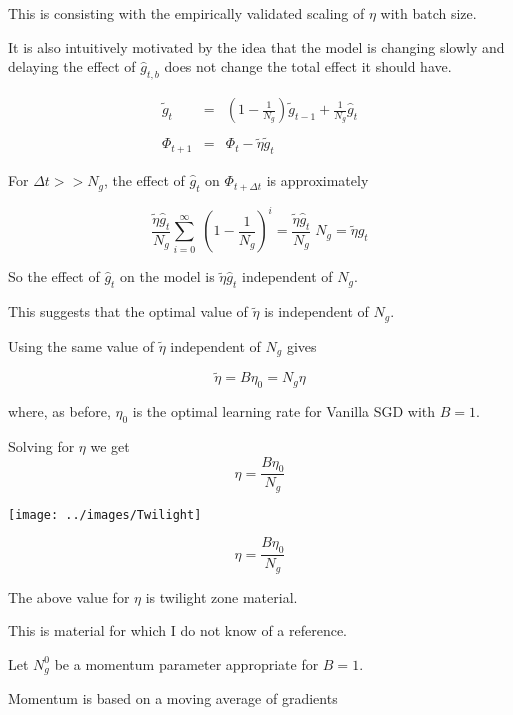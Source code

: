 {\vfill
This is consisting with the empirically validated scaling of $\eta$ with batch size.

\vfill
It is also intuitively motivated by the idea that the model is changing slowly and delaying the effect of $\hat{g}_{t,b}$ does not change the total effect it should have.


\begin{eqnarray*}
\tilde{g}_t & = & \left(1-\frac{1}{N_g}\right)\tilde{g}_{t-1} + \frac{1}{N_g} \hat{g}_t \\
\\
\Phi_{t+1} & = &  \Phi_t - \tilde{\eta}\tilde{g}_t
\end{eqnarray*}

For $\Delta t >> N_g$, the effect of $\hat{g}_t$ on $\Phi_{t+\Delta t}$ is approximately

$$\frac{\tilde{\eta}\hat{g}_t}{N_g}\sum_{i = 0}^\infty \;\left(1 - \frac{1}{N_g}\right)^i = \frac{\tilde{\eta}\hat{g}_t}{N_g}\;N_g = \tilde{\eta}\hat{g}_t$$

\vfill
{\color{red} So the effect of $\hat{g}_t$ on the model is $\tilde{\eta}\hat{g}_t$ independent of $N_g$.}

\vfill
This suggests that the optimal value of $\tilde{\eta}$ is independent of $N_g$.


Using the same value of $\tilde{\eta}$ independent of $N_g$ gives

$$\tilde{\eta} = B\eta_0 = N_g\eta$$

where, as before, $\eta_0$ is the optimal learning rate for Vanilla SGD with $B = 1$.

\vfill
Solving for $\eta$ we get
{\color{red} $$\eta = \frac{B\eta_0}{N_g}$$}

\centerline{\texttt{[image: ../images/Twilight]}}

\vfill
{\color{red} $$\eta = \frac{B\eta_0}{N_g}$$}

\vfill
The above value for $\eta$ is twilight zone material.

\vfill
This is material for which I do not know of a reference. 


Let $N^0_g$ be a momentum parameter appropriate for $B=1$.

\vfill
Momentum is based on a moving average of gradients

}

